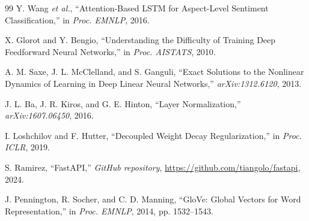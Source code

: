 \documentclass[conference]{IEEEtran}
\begin{document}
\begin{thebibliography}{99}
Y. Wang \textit{et al.}, ``Attention-Based LSTM for Aspect-Level
Sentiment Classification,'' in \textit{Proc. EMNLP}, 2016.

X. Glorot and Y. Bengio, ``Understanding the Difficulty of Training
Deep Feedforward Neural Networks,'' in \textit{Proc. AISTATS}, 2010.

A. M. Saxe, J. L. McClelland, and S. Ganguli, ``Exact Solutions to
the Nonlinear Dynamics of Learning in Deep Linear Neural Networks,''
\textit{arXiv:1312.6120}, 2013.

J. L. Ba, J. R. Kiros, and G. E. Hinton, ``Layer Normalization,''
\textit{arXiv:1607.06450}, 2016.

I. Loshchilov and F. Hutter, ``Decoupled Weight Decay Regularization,''
in \textit{Proc. ICLR}, 2019.

S. Ramirez, ``FastAPI,'' \textit{GitHub repository},
\url{https://github.com/tiangolo/fastapi}, 2024.

J. Pennington, R. Socher, and C. D. Manning, ``GloVe: Global Vectors
for Word Representation,'' in \textit{Proc. EMNLP}, 2014,
pp. 1532--1543.

\end{thebibliography}
\end{document}
